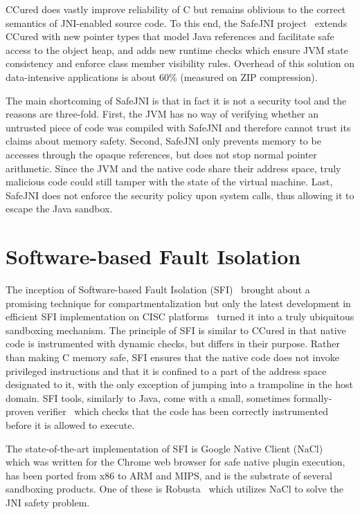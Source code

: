 \documentclass[a4paper,12pt,twoside,openright]{report}
\begin{document}
CCured does vastly improve reliability of C but remains oblivious to the correct semantics of JNI-enabled source code. To this end, the SafeJNI project~\cite{Tan06safejava} extends CCured with new pointer types that model Java references and facilitate safe access to the object heap, and adds new runtime checks which ensure JVM state consistency and enforce class member visibility rules. Overhead of this solution on data-intensive applications is about 60\% (measured on ZIP compression).

The main shortcoming of SafeJNI is that in fact it is not a security tool and the reasons are three-fold. First, the JVM has no way of verifying whether an untrusted piece of code was compiled with SafeJNI and therefore cannot trust its claims about memory safety. Second, SafeJNI only prevents memory to be accesses through the opaque references, but does not stop normal pointer arithmetic. Since the JVM and the native code share their address space, truly malicious code could still tamper with the state of the virtual machine. Last, SafeJNI does not enforce the security policy upon system calls, thus allowing it to escape the Java sandbox.

\section{Software-based Fault Isolation}

The inception of Software-based Fault Isolation (SFI)~\cite{Wahbe:1993:ESF:168619.168635} brought about a promising technique for compartmentalization but only the latest development in efficient SFI implementation on CISC platforms~\cite{McCamant:2006:ESC:1267336.1267351} turned it into a truly ubiquitous sandboxing mechanism. The principle of SFI is similar to CCured in that native code is instrumented with dynamic checks, but differs in their purpose. Rather than making C memory safe, SFI ensures that the native code does not invoke privileged instructions and that it is confined to a part of the address space designated to it, with the only exception of jumping into a trampoline in the host domain. SFI tools, similarly to Java, come with a small, sometimes formally-proven verifier~\cite{Morrisett:2012:RBF:2254064.2254111} which checks that the code has been correctly instrumented before it is allowed to execute.

The state-of-the-art implementation of SFI is Google Native Client (NaCl)~\cite{5207638} which was written for the Chrome web browser for safe native plugin execution, has been ported from x86 to ARM and MIPS, and is the substrate of several sandboxing products. One of these is Robusta~\cite{siefers2010robusta} which utilizes NaCl to solve the JNI safety problem. 
\end{document}
